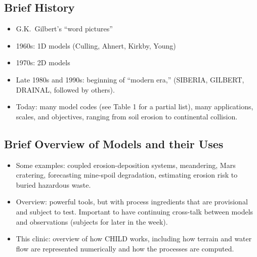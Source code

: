 \documentclass[12pt]{amsart}
\begin{document}
\subsection{Brief History}
\begin{itemize}
\item G.K.\ Gilbert's ``word pictures'' \citep{gilbert1877report}
\item 1960s: 1D models (Culling, Ahnert, Kirkby, Young)
\item 1970s: 2D models 
\item Late 1980s and 1990s: beginning of ``modern era,'' (SIBERIA, GILBERT, DRAINAL, followed by others).
\item Today: many model codes (see Table 1 for a partial list), many applications, scales, and objectives, ranging from soil erosion to continental collision.
\end{itemize}

\subsection{Brief Overview of Models and their Uses}

\begin{itemize}
\item Some examples: coupled erosion-deposition systems, meandering, Mars cratering, forecasting mine-spoil degradation, estimating erosion risk to buried hazardous waste.
\item Overview: powerful tools, but with process ingredients that are provisional and subject to test. Important to have continuing cross-talk between models and observations (subjects for later in the week).
\item This clinic: overview of how CHILD works, including how terrain and water flow are represented numerically and how the processes are computed.
\end{itemize}
\end{document}
